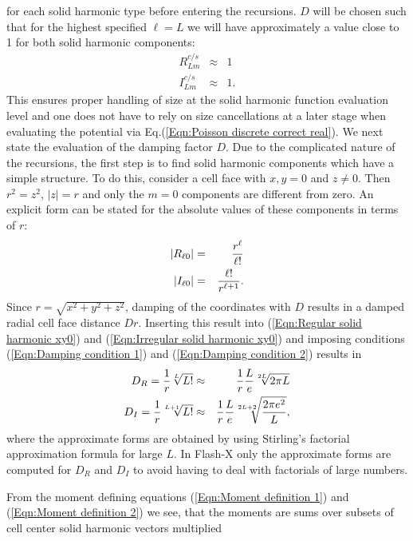 for each solid harmonic type before entering the recursions. $D$ will be chosen such that for the
highest specified $\ell=L$ we will have approximately a value close to 1 for both
solid harmonic components:
\begin{eqnarray}
R^{c/s}_{Lm} & \approx & 1 \label{Eqn:Damping condition 1} \\
I^{c/s}_{Lm} & \approx & 1.\label{Eqn:Damping condition 2}
\end{eqnarray}
This ensures proper handling of size at the solid harmonic function evaluation level and one
does not have to rely on size cancellations at a later stage when evaluating the potential via
Eq.(\ref{Eqn:Poisson discrete correct real}). We next state the evaluation of the
damping factor $D$. Due to the complicated nature of the recursions, the first step is to
find solid harmonic components which have a simple structure. To do this, consider a cell
face with $x,y=0$ and $z\neq 0$. Then $r^2=z^2$, $|z|=r$ and only the $m=0$ components are
different from zero. An explicit form can be stated for the absolute values of these
components in terms of $r$:
\begin{eqnarray}
\label{Eqn:Regular solid harmonic xy0}
|R_{\ell 0}| & = & {r^\ell\over \ell!} \\
|I_{\ell 0}| & = & {\ell!\over r^{\ell+1}}. \label{Eqn:Irregular solid harmonic xy0}
\end{eqnarray}
Since $r=\sqrt{x^2+y^2+z^2}$, damping of the coordinates with $D$ results in a damped
radial cell face distance $Dr$. Inserting this result into (\ref{Eqn:Regular solid harmonic xy0})
and (\ref{Eqn:Irregular solid harmonic xy0})
and imposing conditions (\ref{Eqn:Damping condition 1}) and (\ref{Eqn:Damping condition 2})
results in
\begin{eqnarray}
\label{Eqn:Damping components}
D_R = {1\over r}\sqrt[L]{L!} & \approx & {1\over r}{L\over e}\sqrt[2L]{2\pi L}\\
D_I = {1\over r}\sqrt[L+1]{L!} & \approx & {1\over r}{L\over e}\sqrt[2L+2]{{2\pi e^2\over L}},
\end{eqnarray}
where the approximate forms are obtained by using Stirling's factorial approximation
formula for large $L$. In Flash-X only the approximate forms are computed for $D_R$ and $D_I$
to avoid having to deal with factorials of large numbers.
\par
From the moment defining equations (\ref{Eqn:Moment definition 1}) and (\ref{Eqn:Moment definition 2})
we see, that the moments are sums over subsets of cell center solid harmonic vectors multiplied
